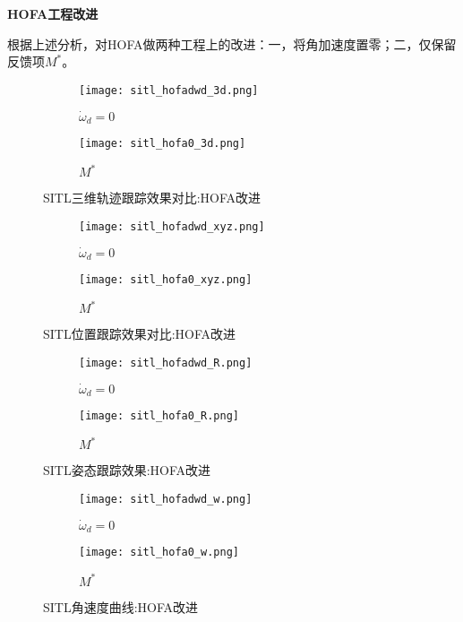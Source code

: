 \textbf{HOFA工程改进}

根据上述分析，对HOFA做两种工程上的改进：一，将角加速度置零；二，仅保留反馈项$M^*$。


\begin{figure}[H]
  \centering
  \begin{subfigure}[b]{0.49\linewidth}
      \texttt{[image: sitl\_hofadwd\_3d.png]}
      \caption{$\dot \omega_d =0$}
  \end{subfigure}
  \hfill %
  \begin{subfigure}[b]{0.49\linewidth}
      \texttt{[image: sitl\_hofa0\_3d.png]}
      \caption{$M^*$}
  \end{subfigure}
  \caption{SITL三维轨迹跟踪效果对比:HOFA改进}
\end{figure}



  \begin{figure}[H]
    \centering
  \begin{subfigure}[b]{0.49\linewidth}
      \texttt{[image: sitl\_hofadwd\_xyz.png]}
      \caption{$\dot \omega_d =0$}
  \end{subfigure}
  \hfill
  \begin{subfigure}[b]{0.49\linewidth}
      \texttt{[image: sitl\_hofa0\_xyz.png]}
      \caption{$M^*$}
  \end{subfigure}
  \caption{SITL位置跟踪效果对比:HOFA改进}
\end{figure}

\begin{figure}[H]
  \centering
\begin{subfigure}[b]{0.49\linewidth}
    \texttt{[image: sitl\_hofadwd\_R.png]}
    \caption{$\dot \omega_d =0$}
\end{subfigure}
\hfill
\begin{subfigure}[b]{0.49\linewidth}
    \texttt{[image: sitl\_hofa0\_R.png]}
    \caption{$M^*$}
\end{subfigure}
\caption{SITL姿态跟踪效果:HOFA改进}
\end{figure}

\begin{figure}[H]
  \centering
\begin{subfigure}[b]{0.49\linewidth}
    \texttt{[image: sitl\_hofadwd\_w.png]}
    \caption{$\dot \omega_d =0$}
\end{subfigure}
\hfill
\begin{subfigure}[b]{0.49\linewidth}
    \texttt{[image: sitl\_hofa0\_w.png]}
    \caption{$M^*$}
\end{subfigure}
\caption{SITL角速度曲线:HOFA改进}
\end{figure}


